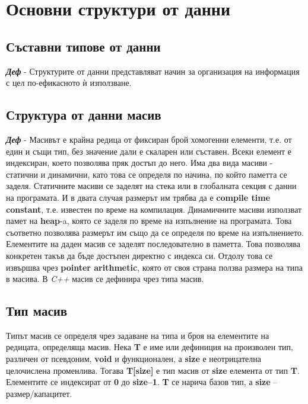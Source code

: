 \documentclass[fleqn,12pt]{article}
\begin{document}
\section{Основни структури от данни}
\subsection{Съставни типове от данни}

\noindent \textit{\textbf{Деф}} - Структурите от данни представляват начин за организация на информация с цел по-ефикасното ѝ използване.

\subsection{Структура от данни масив}

\noindent \textit{\textbf{Деф}} - Масивът е крайна редица от фиксиран брой хомогенни елементи, т.е. от един и същи тип, без значение дали е скаларен или съставен.
Всеки елемент е индексиран, което позволява пряк достъп до него.
\bigbreak
Има два вида масиви - статични и динамични, като това се определя по начина, по който паметта се заделя.
Статичните масиви се заделят на стека или в глобалната секция с данни на програмата. И в двата случая размерът им трябва да 
е \textbf{compile time constant}, т.е. известен по време на компилация.
Динамичните масиви използват памет на \textbf{heap}-a, която се заделя по време на изпълнение на програмата.
Това съответно позволява размерът им също да се определя по време на изпълнението.
\bigbreak
Елементите на даден масив се заделят последователно в паметта.
Това позволява конкретен такъв да бъде достъпен директно с индекса си.
Отдолу това се извършва чрез \textbf{pointer arithmetic}, която от своя страна ползва размера на типа в масива.
\bigbreak
В \textit{C++} масив се дефинира чрез типа масив.

\subsection{Тип масив}

Типът масив се определя чрез задаване на типа и броя на елементите на редицата, определяща масив.
Нека \textbf{T} е име или дефиниция на произволен тип, различен от псевдоним, \textbf{void} и функционален, а \textbf{size} е неотрицателна целочислена променлива.
Тогава \textbf{T[size]} е тип масив от \textbf{size} елемента от тип \textbf{T}.
Елементите се индексират от \textbf{0} до \textbf{size–1}.
\textbf{T} се нарича базов тип, а \textbf{size} – размер/капацитет.
\end{document}
